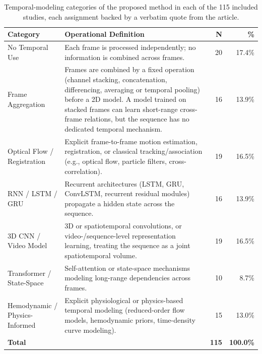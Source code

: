 \renewcommand{\arraystretch}{1.25}
\begin{table}[pos=ht]
\centering
\caption{Temporal-modeling categories of the proposed method in each of the 115 included studies, each assignment backed by a verbatim quote from the article.}
\label{tab:temporal_taxonomy}
\begin{tabularx}{\textwidth}{@{}l X r r@{}}
\toprule
\textbf{Category} & \textbf{Operational Definition} & \textbf{N} & \textbf{\%} \\
\midrule
No Temporal Use
  & Each frame is processed independently; no information is combined across frames.
  & 20 & 17.4\% \\
\dashedrule
Frame Aggregation
  & Frames are combined by a fixed operation (channel stacking, concatenation, differencing, averaging or temporal pooling) before a 2D model. A model trained on stacked frames can learn short-range cross-frame relations, but the sequence has no dedicated temporal mechanism.
  & 16 & 13.9\% \\
\dashedrule
Optical Flow / Registration
  & Explicit frame-to-frame motion estimation, registration, or classical tracking/association (e.g., optical flow, particle filters, cross-correlation).
  & 19 & 16.5\% \\
\dashedrule
RNN / LSTM / GRU
  & Recurrent architectures (LSTM, GRU, ConvLSTM, recurrent residual modules) propagate a hidden state across the sequence.
  & 16 & 13.9\% \\
\dashedrule
3D CNN / Video Model
  & 3D or spatiotemporal convolutions, or video-/sequence-level representation learning, treating the sequence as a joint spatiotemporal volume.
  & 19 & 16.5\% \\
\dashedrule
Transformer / State-Space
  & Self-attention or state-space mechanisms modeling long-range dependencies across frames.
  & 10 & 8.7\% \\
\dashedrule
Hemodynamic / Physics-Informed
  & Explicit physiological or physics-based temporal modeling (reduced-order flow models, hemodynamic priors, time-density curve modeling).
  & 15 & 13.0\% \\
\midrule
\textbf{Total} & & \textbf{115} & \textbf{100.0\%} \\
\bottomrule
\end{tabularx}
\end{table}
